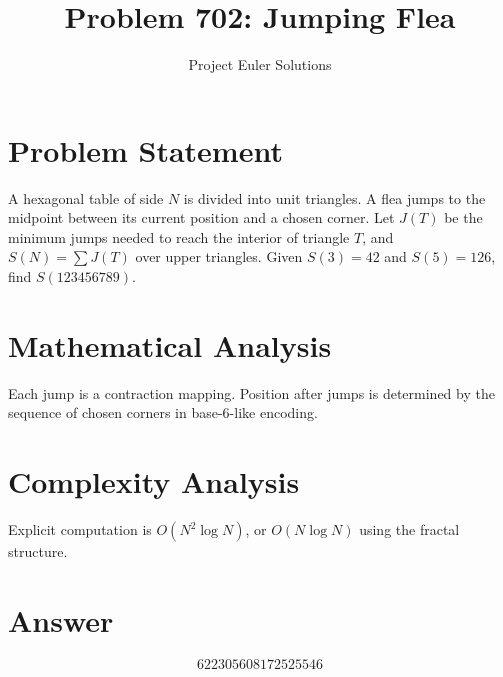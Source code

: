 \documentclass[11pt]{article}
\title{Problem 702: Jumping Flea}
\author{Project Euler Solutions}
\date{}
\begin{document}
\maketitle

\section{Problem Statement}

A hexagonal table of side $N$ is divided into unit triangles. A flea jumps to the midpoint between its current position and a chosen corner. Let $J(T)$ be the minimum jumps needed to reach the interior of triangle $T$, and $S(N)=\sum J(T)$ over upper triangles. Given $S(3)=42$ and $S(5)=126$, find $S(123456789)$.

\section{Mathematical Analysis}

Each jump is a contraction mapping. Position after jumps is determined by the sequence of chosen corners in base-6-like encoding.

\section{Complexity Analysis}

Explicit computation is $O(N^2 \log N)$, or $O(N \log N)$ using the fractal structure.

\section{Answer}

\[
\boxed{622305608172525546}
\]
\end{document}
